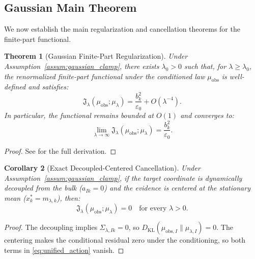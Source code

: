\documentclass[11pt]{amsart}
\theoremstyle{plain}
\newtheorem{theorem}{Theorem}
\newtheorem{corollary}[theorem]{Corollary}
\theoremstyle{definition}
\theoremstyle{remark}
\newcommand{\KL}{D_{\operatorname{KL}}}
\begin{document}
\subsection{Gaussian Main Theorem}
\label{sec:gaussian:theorem}

We now establish the main regularization and cancellation theorems for the finite-part functional.

\begin{theorem}[Gaussian Finite-Part Regularization]
  \label{thm:finite_part_regularization}
  Under Assumption~\ref{assum:gaussian_clamp}, there exists $\lambda_0>0$ such that, for $\lambda\ge\lambda_0$, the renormalized finite-part functional under the conditioned law $\mu_{\mathrm{obs}}$ is well-defined and satisfies:
  \begin{equation}
    \label{eq:unified_regularization}
    \mathfrak{J}_\lambda(\mu_{\mathrm{obs}}; \mu_\lambda) = \frac{b_k^2}{\varepsilon_0} + O(\lambda^{-4}).
  \end{equation}
  In particular, the functional remains bounded at $O(1)$ and converges to:
  \begin{equation}
    \lim_{\lambda\to\infty} \mathfrak{J}_\lambda(\mu_{\mathrm{obs}}; \mu_\lambda) = \frac{b_k^2}{\varepsilon_0}.
  \end{equation}
\end{theorem}
\begin{proof}
  See  for the full derivation.
\end{proof}

\begin{corollary}[Exact Decoupled-Centered Cancellation]
  \label{cor:exact_pole_zero}
  Under Assumption~\ref{assum:gaussian_clamp}, if the target coordinate is dynamically decoupled from the bulk ($a_{Ik} = 0$) and the evidence is centered at the stationary mean ($x_k^* = m_{\lambda,k}$), then:
  \begin{equation}
    \mathfrak{J}_\lambda(\mu_{\mathrm{obs}}; \mu_\lambda) = 0 \quad \text{for every } \lambda > 0.
  \end{equation}
\end{corollary}
\begin{proof}
  The decoupling implies $\Sigma_{\lambda,Ik} = 0$, so $\KL(\mu_{\text{obs},I} \parallel \mu_{\lambda,I}) = 0$. The centering makes the conditional residual zero under the conditioning, so both terms in \eqref{eq:unified_action} vanish.
\end{proof}

\end{document}

